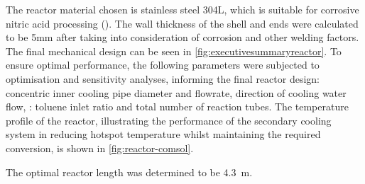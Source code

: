
The reactor material chosen is stainless steel 304L, which is suitable for corrosive nitric acid processing  (). The wall thickness of the shell and ends were calculated to be 5mm after taking into consideration of corrosion and other welding factors. The final mechanical design can be seen in \cref{fig:executivesummaryreactor}.
To ensure optimal performance, the following parameters were subjected to optimisation and sensitivity analyses, informing the final reactor design: concentric inner cooling pipe diameter and flowrate, direction of cooling water flow,  : toluene inlet ratio and total number of reaction tubes. The temperature profile of the reactor, illustrating the performance of the secondary cooling system in reducing hotspot temperature whilst maintaining the required conversion, is shown in \cref{fig:reactor-comsol}.  %

The optimal reactor length was determined to be \SI{4.3}{\m}.
